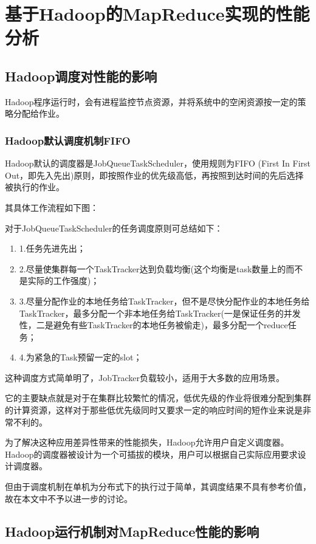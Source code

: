 \chapter{基于Hadoop的MapReduce实现的性能分析}
\label{chap:4}

\section{Hadoop调度对性能的影响}
Hadoop程序运行时，会有进程监控节点资源，并将系统中的空闲资源按一定的策略分配给作业。
\subsection{Hadoop默认调度机制FIFO}
Hadoop默认的调度器是JobQueueTaskScheduler，使用规则为FIFO (First In First Out，即先入先出)原则，即按照作业的优先级高低，再按照到达时间的先后选择被执行的作业。

其具体工作流程如下图：

对于JobQueueTaskScheduler的任务调度原则可总结如下：

\begin{enumerate}
\item 1.任务先进先出；
\item 2.尽量使集群每一个TaskTracker达到负载均衡(这个均衡是task数量上的而不是实际的工作强度)；
\item 3.尽量分配作业的本地任务给TaskTracker，但不是尽快分配作业的本地任务给TaskTracker，最多分配一个非本地任务给TaskTracker(一是保证任务的并发性，二是避免有些TaskTracker的本地任务被偷走)，最多分配一个reduce任务；
\item 4.为紧急的Task预留一定的slot；
\end{enumerate}


这种调度方式简单明了，JobTracker负载较小，适用于大多数的应用场景。

它的主要缺点就是对于在集群比较繁忙的情况，低优先级的作业将很难分配到集群的计算资源，这样对于那些低优先级同时又要求一定的响应时间的短作业来说是非常不利的。

为了解决这种应用差异性带来的性能损失，Hadoop允许用户自定义调度器。Hadoop的调度器被设计为一个可插拔的模块，用户可以根据自己实际应用要求设计调度器。

但由于调度机制在单机为分布式下的执行过于简单，其调度结果不具有参考价值，故在本文中不予以进一步的讨论。

\section{Hadoop运行机制对MapReduce性能的影响}
